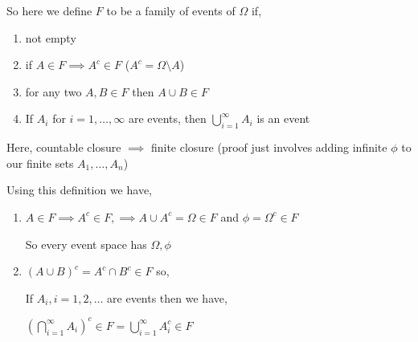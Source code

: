 \begin{definition}

        So here we define $F$ to be a family of events of  $\Omega$ if, 
        \begin{enumerate}
            \item not empty
            \item if $A \in F \implies A^{c} \in F$ ($A^{c} = \Omega \setminus A$)
            \item for any two $A, B \in F$ then  $A \cup B \in F$
            \item If $A_i$ for  $i = 1,\dots,\infty$ are events, then  $\bigcup_{i = 1}^{\infty} A_i$  is an event
        \end{enumerate}


\end{definition}
\begin{note}
    Here, countable closure $\implies$ finite closure (proof just involves adding infinite $\phi$ to our finite sets $A_1, \dots, A_n$)
\end{note}
\begin{note}
    Using this definition we have, 
    \begin{enumerate}
        \item $A \in F \implies A^{c} \in F, \implies A \cup A^{c} = \Omega \in F$ and  $\phi = \Omega^{c} \in F$

    So every event space has $\Omega, \phi$
        \item $(A \cup B)^{c} = A^{c} \cap B^{c} \in F $ so, 

            If $A_i, i = 1,2, \dots$ are events then we have, 

            $(\bigcap_{i = 1}^{\infty} A_i)^{c} \in F = \bigcup_{i = 1}^{\infty}A_i^{c} \in F $
    \end{enumerate}
\end{note}






